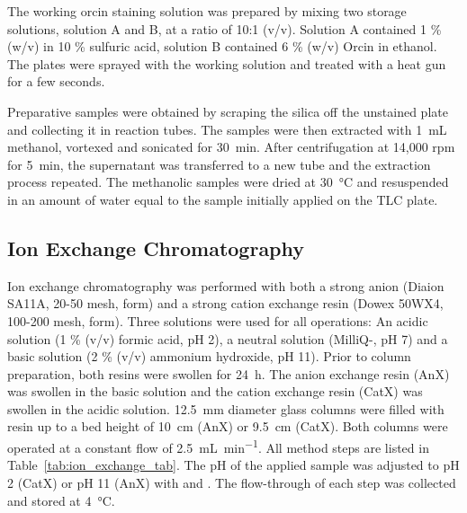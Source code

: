 	The working orcin staining solution was prepared by mixing two storage solutions, solution A and B, at a ratio of 10:1 (v/v). Solution A contained 1 \% (w/v)  in 10 \% sulfuric acid, solution B contained 6 \% (w/v) Orcin in ethanol. The plates were sprayed with the working solution and treated with a heat gun for a few seconds.

	Preparative samples were obtained by scraping the silica off the unstained plate and collecting it in reaction tubes. The samples were then extracted with \SI{1}{\milli\liter} methanol, vortexed and sonicated for \SI{30}{\minute}. After centrifugation at 14,000 rpm for \SI{5}{\minute}, the supernatant was transferred to a new tube and the extraction process repeated. The methanolic samples were dried at \SI{30}{\celsius} and resuspended in an amount of water equal to the sample initially applied on the TLC plate.

	\subsection{Ion Exchange Chromatography} %
	\label{sub:ion_exchange_chromatography}

	Ion exchange chromatography was performed with both a strong anion (Diaion SA11A, 20-50 mesh,  form) and a strong cation exchange resin (Dowex 50WX4, 100-200 mesh,  form). Three solutions were used for all operations: An acidic solution (1 \% (v/v) formic acid, pH 2), a neutral solution (MilliQ-, pH 7) and a basic solution (2 \% (v/v) ammonium hydroxide, pH 11).
	Prior to column preparation, both resins were swollen for \SI{24}{\hour}. The anion exchange resin (AnX) was swollen in the basic solution and the cation exchange resin (CatX) was swollen in the acidic solution. \SI{12.5}{\milli\meter} diameter glass columns were filled with resin up to a bed height of \SI{10}{\centi\meter} (AnX) or \SI{9.5}{\centi\meter} (CatX).
	Both columns were operated at a constant flow of \SI{2.5}{\milli\liter\per\minute}. All method steps are listed in Table~\ref{tab:ion_exchange_tab}. The pH of the applied sample was adjusted to pH 2 (CatX) or pH 11 (AnX) with  and . The flow-through of each step was collected and stored at \SI{4}{\celsius}.

